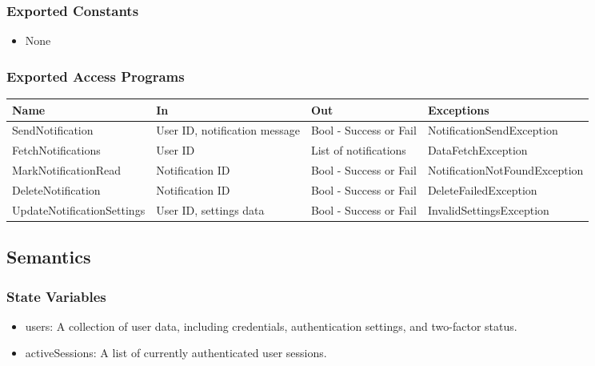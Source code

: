 \documentclass[12pt, titlepage]{article}
\begin{document}
\subsubsection{Exported Constants}

\begin{itemize}
  \item None
\end{itemize}

\subsubsection{Exported Access Programs}

\begin{center}
  \begin{tabular}{p{5cm} p{3cm} p{3cm} p{5cm}}
    \hline
    \textbf{Name}              & \textbf{In}                   & \textbf{Out}           & \textbf{Exceptions}           \\
    \hline
    SendNotification           & User ID, notification message & Bool - Success or Fail & NotificationSendException     \\
    \hline
    FetchNotifications         & User ID                       & List of notifications  & DataFetchException            \\
    \hline
    MarkNotificationRead       & Notification ID               & Bool - Success or Fail & NotificationNotFoundException \\
    \hline
    DeleteNotification         & Notification ID               & Bool - Success or Fail & DeleteFailedException         \\
    \hline
    UpdateNotificationSettings & User ID, settings data        & Bool - Success or Fail & InvalidSettingsException      \\
    \hline
  \end{tabular}
\end{center}

\subsection{Semantics}

\subsubsection{State Variables}

\begin{itemize}
  \item users: A collection of user data, including credentials, authentication settings, and two-factor status.
  \item activeSessions: A list of currently authenticated user sessions.
\end{itemize}
\end{document}
